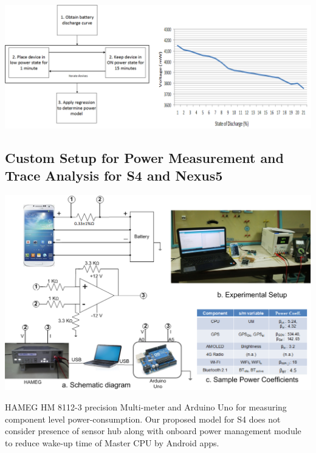 \documentclass[a0,portrait]{a0poster}
\begin{document}
\begin{multicols}{2}
\begin{equation}
\end{equation}


\begin{center}\vspace{1cm}
\includegraphics[width=0.8\linewidth]{PowerBooter}
\end{center}\vspace{1cm}
\color{SaddleBrown}
\subsection*{Custom Setup for Power Measurement and Trace Analysis for S4 and Nexus5}
\color{DarkSlateGray}
\begin{center}\vspace{1cm}
\includegraphics[width=1.0\linewidth]{CustomSetUpNew2}
\end{center}\vspace{1cm}
HAMEG HM 8112-3 precision Multi-meter and Arduino Uno for measuring component level power-consumption. Our proposed model for S4 does not consider presence of sensor hub along with onboard power management module to reduce wake-up time of Master CPU by Android apps.%
%


\end{multicols}
\end{document}
